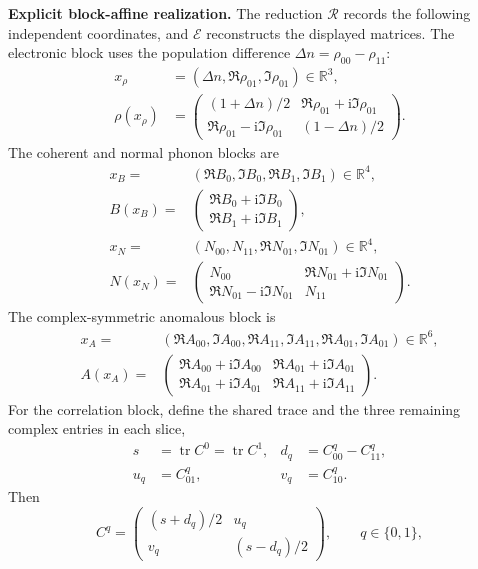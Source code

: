 \documentclass[10pt,letterpaper,twocolumn]{article}
\newcommand{\R}{\mathbb R}
\newcommand{\ii}{\mathrm i}
\begin{document}
\textbf{Explicit block-affine realization.}
The reduction \(\mathcal R\) records the following independent coordinates,
and \(\mathcal E\) reconstructs the displayed matrices.  The electronic block
uses the population difference \(\Delta n=\rho_{00}-\rho_{11}\):
\[
\begin{aligned}
x_\rho&=(\Delta n,\Re\rho_{01},\Im\rho_{01})\in\R^3,\\
\rho(x_\rho)&=
\begin{pmatrix}
(1+\Delta n)/2&\Re\rho_{01}+\ii\Im\rho_{01}\\
\Re\rho_{01}-\ii\Im\rho_{01}&(1-\Delta n)/2
\end{pmatrix}.
\end{aligned}
\tag{R1}
\]
The coherent and normal phonon blocks are
\[
\begin{aligned}
x_B={}&(\Re B_0,\Im B_0,\Re B_1,\Im B_1)\in\R^4,\\
B(x_B)={}&
\begin{pmatrix}
\Re B_0+\ii\Im B_0\\
\Re B_1+\ii\Im B_1
\end{pmatrix},\\[2pt]
x_N={}&(N_{00},N_{11},\Re N_{01},\Im N_{01})\in\R^4,\\
N(x_N)={}&
\begin{pmatrix}
N_{00}&\Re N_{01}+\ii\Im N_{01}\\
\Re N_{01}-\ii\Im N_{01}&N_{11}
\end{pmatrix}.
\end{aligned}
\tag{R2}
\]
The complex-symmetric anomalous block is
{\small
\[
\begin{aligned}
x_A={}&(\Re A_{00},\Im A_{00},\Re A_{11},\Im A_{11},
\Re A_{01},\Im A_{01})\in\R^6,\\
A(x_A)={}&
\begin{pmatrix}
\Re A_{00}+\ii\Im A_{00}&\Re A_{01}+\ii\Im A_{01}\\
\Re A_{01}+\ii\Im A_{01}&\Re A_{11}+\ii\Im A_{11}
\end{pmatrix}.
\end{aligned}
\tag{R3}
\]
}
For the correlation block, define the shared trace and the three remaining
complex entries in each slice,
\[
\begin{aligned}
s&=\operatorname{tr}C^0=\operatorname{tr}C^1,
&d_q&=C^q_{00}-C^q_{11},\\
u_q&=C^q_{01},
&v_q&=C^q_{10}.
\end{aligned}
\tag{R4}
\]
Then
\[
C^q=
\begin{pmatrix}(s+d_q)/2&u_q\\v_q&(s-d_q)/2\end{pmatrix},
\qquad q\in\{0,1\},
\tag{R5}
\]
\end{document}
